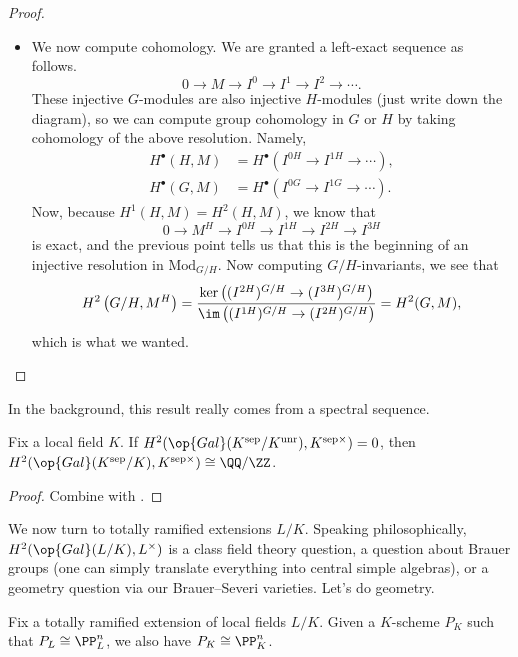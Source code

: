 \documentclass[../notes.tex]{subfiles}
\begin{document}
\begin{proof}
\begin{itemize}
		\item We now compute cohomology. We are granted a left-exact sequence as follows.
		\[0\to M\to I^0\to I^1\to I^2\to\cdots.\]
		These injective $G$-modules are also injective $H$-modules (just write down the diagram), so we can compute group cohomology in $G$ or $H$ by taking cohomology of the above resolution. Namely,
		\begin{align*}
			H^\bullet(H,M) &= H^\bullet\left(I^{0H}\to I^{1H}\to\cdots\right), 
			\\
			H^\bullet(G,M) &= H^\bullet\left(I^{0G}\to I^{1G}\to\cdots\right).
		\end{align*}
		Now, because $H^1(H,M)=H^2(H,M)$, we know that
		\[0\to M^H\to I^{0H}\to I^{1H}\to I^{2H}\to I^{3H}\]
		is exact, and the previous point tells us that this is the beginning of an injective resolution in $\mathrm{Mod}_{G/H}$. Now computing $G/H$-invariants, we see that
		\[H^2\left(G/H,M^H\right)=\frac{\ker\left((I^{2H})^{G/H}\to (I^{3H})^{G/H}\right)}{\im\left((I^{1H})^{G/H}\to (I^{2H})^{G/H}\right)}=H^2(G,M),\]
		which is what we wanted.
		\qedhere
	\end{itemize}
\end{proof}
\begin{remark}
	In the background, this result really comes from a spectral sequence.
\end{remark}
\begin{corollary}
	Fix a local field $K$. If $H^2(\op{Gal}(K^{\mathrm{sep}}/K^{\mathrm{unr}}),K^{\mathrm{sep}\times})=0$, then $H^2(\op{Gal}(K^{\mathrm{sep}}/K),K^{\mathrm{sep}\times})\cong\QQ/\ZZ$.
\end{corollary}
\begin{proof}
	Combine  with .
\end{proof}
We now turn to totally ramified extensions $L/K$. Speaking philosophically, $H^2(\op{Gal}(L/K),L^\times)$ is a class field theory question, a question about Brauer groups (one can simply translate everything into central simple algebras), or a geometry question via our Brauer--Severi varieties. Let's do geometry.
\begin{lemma}
	Fix a totally ramified extension of local fields $L/K$. Given a $K$-scheme $P_K$ such that $P_L\cong\PP^n_L$, we also have $P_K\cong\PP^n_K$.
\end{lemma}
\end{document}
